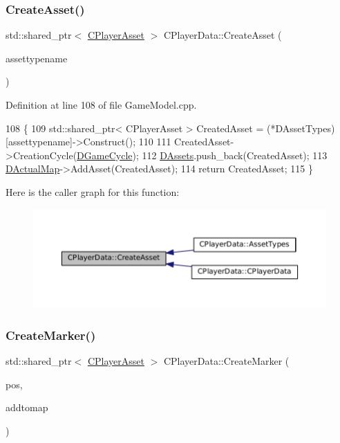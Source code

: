 \subsubsection{\texorpdfstring{Create\+Asset()}{CreateAsset()}}
{\footnotesize\ttfamily std\+::shared\+\_\+ptr$<$ \hyperlink{classCPlayerAsset}{C\+Player\+Asset} $>$ C\+Player\+Data\+::\+Create\+Asset (\begin{DoxyParamCaption}\item[{const std\+::string \&}]{assettypename }\end{DoxyParamCaption})}



Definition at line 108 of file Game\+Model.\+cpp.


\begin{DoxyCode}
108                                                                                     \{
109     std::shared\_ptr< CPlayerAsset > CreatedAsset = (*DAssetTypes)[assettypename]->Construct();
110     
111     CreatedAsset->CreationCycle(\hyperlink{classCPlayerData_ae92ca06a63a01681dd9f3ddc17c0e106}{DGameCycle});
112     \hyperlink{classCPlayerData_a1d7dd355facf52db6242e3554373906c}{DAssets}.push\_back(CreatedAsset);
113     \hyperlink{classCPlayerData_a943801106af1d7ad52abd73d32552186}{DActualMap}->AddAsset(CreatedAsset);
114     \textcolor{keywordflow}{return} CreatedAsset;
115 \}
\end{DoxyCode}
Here is the caller graph for this function\+:
\nopagebreak
\begin{figure}[H]
\begin{center}
\leavevmode
\includegraphics[width=350pt]{classCPlayerData_a4d203da2adbd6d00b0cd5b334bddba4f_icgraph}
\end{center}
\end{figure}
\hypertarget{classCPlayerData_a4ef7c98c3b0f28354a2bccc2782b57ad}{}\label{classCPlayerData_a4ef7c98c3b0f28354a2bccc2782b57ad} 
\subsubsection{\texorpdfstring{Create\+Marker()}{CreateMarker()}}
{\footnotesize\ttfamily std\+::shared\+\_\+ptr$<$ \hyperlink{classCPlayerAsset}{C\+Player\+Asset} $>$ C\+Player\+Data\+::\+Create\+Marker (\begin{DoxyParamCaption}\item[{const \hyperlink{classCPosition}{C\+Position} \&}]{pos,  }\item[{bool}]{addtomap }\end{DoxyParamCaption})}



